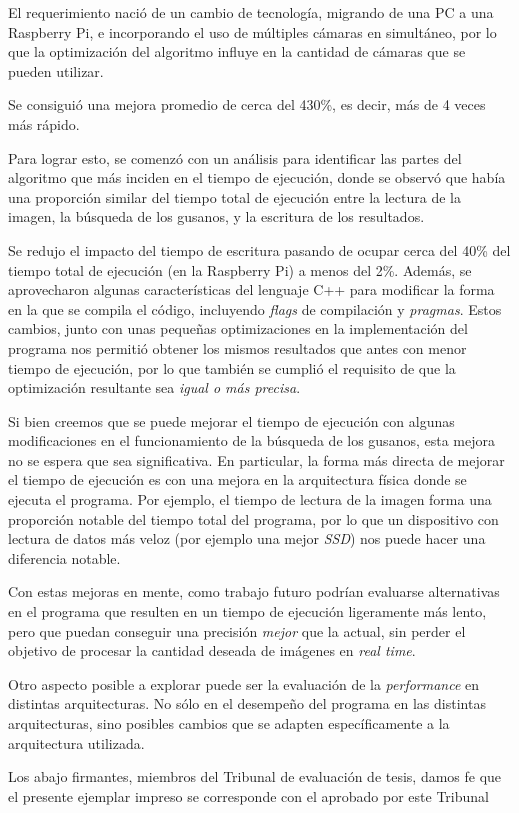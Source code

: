\documentclass{article}
\begin{document}
El requerimiento nació de un cambio de tecnología, migrando de una PC a una Raspberry Pi, e incorporando el uso de múltiples cámaras en simultáneo, por lo que la optimización del algoritmo influye en la cantidad de cámaras que se pueden utilizar.

Se consiguió una mejora promedio de cerca del 430\%, es decir, más de 4 veces más rápido.
 
Para lograr esto, se comenzó con un análisis para identificar las partes del algoritmo que más inciden en el tiempo de ejecución, donde se observó que había una proporción similar del tiempo total de ejecución entre la lectura de la imagen, la búsqueda de los gusanos, y la escritura de los resultados.

Se redujo el impacto del tiempo de escritura pasando de ocupar cerca del 40\% del tiempo total de ejecución (en la Raspberry Pi) a menos del 2\%. Además, se aprovecharon algunas características del lenguaje C++ para modificar la forma en la que se compila el código, incluyendo \emph{flags} de compilación y \emph{pragmas}. Estos cambios, junto con unas pequeñas optimizaciones en la implementación del programa nos permitió obtener los mismos resultados que antes con menor tiempo de ejecución, por lo que también se cumplió el requisito de que la optimización resultante sea \emph{igual o más precisa}. 

Si bien creemos que se puede mejorar el tiempo de ejecución con algunas modificaciones en el funcionamiento de la búsqueda de los gusanos, esta mejora no se espera que sea significativa. En particular, la forma más directa de mejorar el tiempo de ejecución es con una mejora en la arquitectura física donde se ejecuta el programa. Por ejemplo, el tiempo de lectura de la imagen forma una proporción notable del tiempo total del programa, por lo que un dispositivo con lectura de datos más veloz (por ejemplo una mejor \emph{SSD}) nos puede hacer una diferencia notable.

Con estas mejoras en mente, como trabajo futuro podrían evaluarse alternativas en el programa que resulten en un tiempo de ejecución ligeramente más lento, pero que puedan conseguir una precisión \emph{mejor} que la actual, sin perder el objetivo de procesar la cantidad deseada de imágenes en \emph{real time}.

Otro aspecto posible a explorar puede ser la evaluación de la \emph{performance} en distintas arquitecturas. No sólo en el desempeño del programa en las distintas arquitecturas, sino posibles cambios que se adapten específicamente a la arquitectura utilizada.

\newpage
{}

\newpage
{}
Los abajo firmantes, miembros del Tribunal de evaluación de tesis, damos fe que el presente  ejemplar impreso se corresponde con el aprobado por este Tribunal
\end{document}
